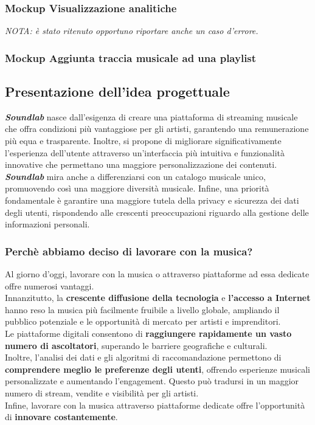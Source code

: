 \documentclass{article}
\begin{document}
			\subsubsection{Mockup Visualizzazione analitiche}
			\textit{NOTA: è stato ritenuto opportuno riportare anche un caso d'errore.}
			
			
			\subsubsection{Mockup Aggiunta traccia musicale ad una playlist}
			
		\subsection{Presentazione dell'idea progettuale}
		\textbf{\textit{\textcolor{dark_purple}{Soundlab}}} nasce dall'esigenza di creare una piattaforma di streaming musicale che offra condizioni più vantaggiose per gli artisti, garantendo una remunerazione più equa e trasparente. Inoltre, si propone di migliorare significativamente l'esperienza dell'utente attraverso un'interfaccia più intuitiva e funzionalità innovative che permettano una maggiore personalizzazione dei contenuti.\\
		\textbf{\textit{\textcolor{dark_purple}{Soundlab}}} mira anche a differenziarsi con un catalogo musicale unico, promuovendo così una maggiore diversità musicale. Infine, una priorità fondamentale è garantire una maggiore tutela della privacy e sicurezza dei dati degli utenti, rispondendo alle crescenti preoccupazioni riguardo alla gestione delle informazioni personali.
		
			\subsubsection{Perchè abbiamo deciso di lavorare con la musica?}
			Al giorno d'oggi, lavorare con la musica o attraverso piattaforme ad essa dedicate offre numerosi vantaggi.\\ Innanzitutto, la \textbf{crescente diffusione della tecnologia} e \textbf{l'accesso a Internet} hanno reso la musica più facilmente fruibile a livello globale, ampliando il pubblico potenziale e le opportunità di mercato per artisti e imprenditori. \\Le piattaforme digitali consentono di \textbf{raggiungere rapidamente un vasto numero di ascoltatori}, superando le barriere geografiche e culturali.\\Inoltre, l'analisi dei dati e gli algoritmi di raccomandazione permettono di \textbf{comprendere meglio le preferenze degli utenti}, offrendo esperienze musicali personalizzate e aumentando l'engagement. Questo può tradursi in un maggior numero di stream, vendite e visibilità per gli artisti.\\
			Infine, lavorare con la musica attraverso piattaforme dedicate offre l'opportunità di \textbf{innovare costantemente}.
\end{document}
